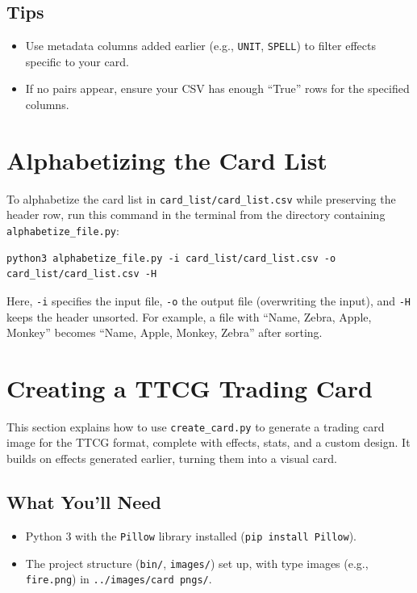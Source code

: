 \subsection{Tips}
\begin{itemize}
	\item Use metadata columns added earlier (e.g., \texttt{UNIT}, \texttt{SPELL}) to filter effects specific to your card.
	\item If no pairs appear, ensure your CSV has enough ``True'' rows for the specified columns.
\end{itemize}










\section{Alphabetizing the Card List}
To alphabetize the card list in \texttt{card\_list/card\_list.csv} while preserving the header row, run this command in the terminal from the directory containing \texttt{alphabetize\_file.py}:

\begin{lstlisting}[style=terminalstyle]
python3 alphabetize_file.py -i card_list/card_list.csv -o card_list/card_list.csv -H
\end{lstlisting}

Here, \texttt{-i} specifies the input file, \texttt{-o} the output file (overwriting the input), and \texttt{-H} keeps the header unsorted. For example, a file with ``Name, Zebra, Apple, Monkey'' becomes ``Name, Apple, Monkey, Zebra'' after sorting.













\section{Creating a TTCG Trading Card}

This section explains how to use \texttt{create\_card.py} to generate a trading card image for the TTCG format, complete with effects, stats, and a custom design. It builds on effects generated earlier, turning them into a visual card.

\subsection{What You’ll Need}
\begin{itemize}
	\item Python 3 with the \texttt{Pillow} library installed (\texttt{pip install Pillow}).
	\item The project structure (\texttt{bin/}, \texttt{images/}) set up, with type images (e.g., \texttt{fire.png}) in \texttt{../images/card pngs/}.
\end{itemize}

